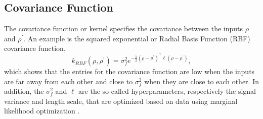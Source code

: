 \documentclass[letterpaper, 10 pt, conference]{ieeeconf}  %
\newcounter{example}
\begin{document}
\subsection{Covariance Function}
\label{sec:covarianceFunction}
The covariance function or kernel specifies the covariance between the inputs $\rho$ and $\rho^\prime$. An example is the squared exponential or Radial Basis Function (RBF) covariance function,
\begin{equation}
	\label{eq:RBFKernel}
	k_{RBF}\left(\rho, \rho^{\prime}\right)=\sigma_{f}^{2} e^{-\frac{1}{2}\left(\rho-\rho^{\prime}\right)^{\top} \ell\left(\rho-\rho^{\prime}\right)},
\end{equation}
which shows that the entries for the covariance function are low when the inputs are far away from each other and close to $\sigma_f^2$ when they are close to each other. In addition, the $\sigma_f^2$ and $\ell$ are the so-called hyperparameters, respectively the signal variance and length scale, that are optimized based on data using marginal likelihood optimization \cite[Chapter~5]{Rasmussen2004}.
\end{document}
